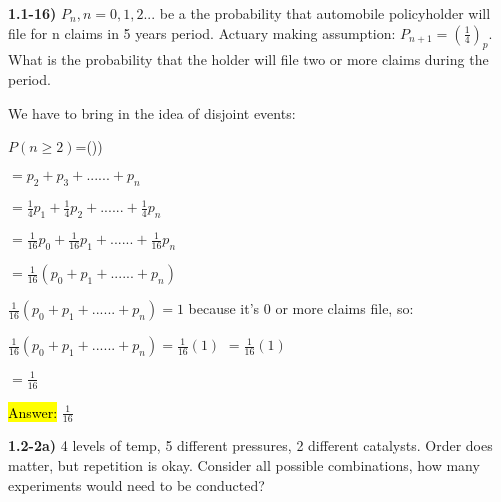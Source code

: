 \documentclass{article}
\begin{document}
\newpage

\textbf{1.1-16)} $P_{n}, n=0,1,2... $ be a the probability that automobile policyholder will file for n claims in 5 years period. Actuary making assumption: $P_{n+1}=
 (\frac{1}{4})_{p}.$ What is the probability that the holder will file two or more claims during the period.
 
  \vspace{2mm}
 
 We have to bring in the idea of disjoint events:
 \vspace{2mm}
 
$P(n\ge2)$=())

\hspace{.55in}$=p_{2}+p_{3}+......+p_{n}$

\hspace{.55in}$=\frac{1}{4}p_{1}+\frac{1}{4}p_{2}+......+\frac{1}{4}p_{n}$

\hspace{.55in}$=\frac{1}{16}p_{0}+\frac{1}{16}p_{1}+......+\frac{1}{16}p_{n}$

\hspace{.55in}$=\frac{1}{16}(p_{0}+p_{1}+......+p_{n})$

\vspace{4mm}
$\frac{1}{16}(p_{0}+p_{1}+......+p_{n})=1$ because it's 0 or more claims file, so:
\vspace{2mm}


$\frac{1}{16}(p_{0}+p_{1}+......+p_{n})=\frac{1}{16}(1)$
 \vspace{2mm}
$=\frac{1}{16}(1)$

\hspace{1.43in}$=\frac{1}{16}$

\hl{Answer:} $\frac{1}{16}$



\newpage

\textbf{1.2-2a)} 4 levels of temp, 5 different pressures, 2 different catalysts. Order does matter, but repetition is okay. Consider all possible combinations, how many experiments would need to be conducted?

\vspace{4mm}
\end{document}
